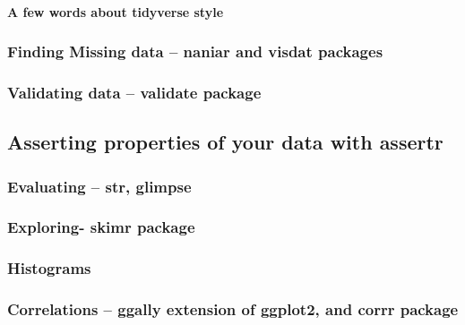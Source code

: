 \documentclass[
]{book}
\begin{document}
\hypertarget{a-few-words-about-tidyverse-style}{%
\paragraph{A few words about tidyverse style}\label{a-few-words-about-tidyverse-style}}

\hypertarget{finding-missing-data-naniar-and-visdat-packages}{%
\subsubsection{Finding Missing data -- naniar and visdat packages}\label{finding-missing-data-naniar-and-visdat-packages}}

\hypertarget{validating-data-validate-package}{%
\subsubsection{Validating data -- validate package}\label{validating-data-validate-package}}

\hypertarget{asserting-properties-of-your-data-with-assertr}{%
\subsection{Asserting properties of your data with assertr}\label{asserting-properties-of-your-data-with-assertr}}

\hypertarget{evaluating-str-glimpse}{%
\subsubsection{Evaluating -- str, glimpse}\label{evaluating-str-glimpse}}

\hypertarget{exploring--skimr-package}{%
\subsubsection{Exploring- skimr package}\label{exploring--skimr-package}}

\hypertarget{histograms}{%
\subsubsection{Histograms}\label{histograms}}

\hypertarget{correlations-ggally-extension-of-ggplot2-and-corrr-package}{%
\subsubsection{Correlations -- ggally extension of ggplot2, and corrr package}\label{correlations-ggally-extension-of-ggplot2-and-corrr-package}}
\end{document}
